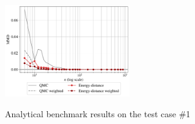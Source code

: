 \begin{figure}[!h]
\begin{center}
    \includegraphics[width=0.48\textwidth]{part2/figures/DCE/analytical_bench/Gaussian_Mixture_convergence_MMD_ED.pdf}\\
\end{center}
\caption{Analytical benchmark results on the test case \#1} \label{fig:test case1}
\end{figure}

